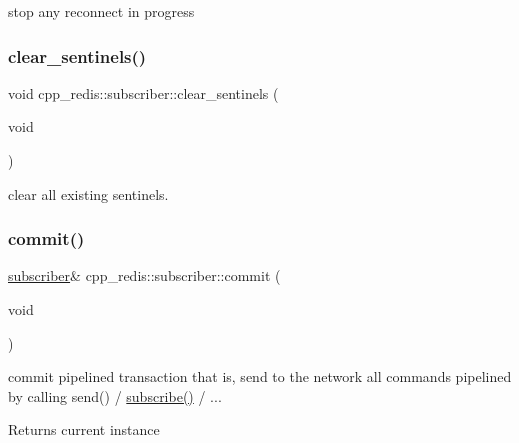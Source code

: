 stop any reconnect in progress \mbox{\label{classcpp__redis_1_1subscriber_ac8f371c14866842cdda7cf1ee5eee2b8}} 
\subsubsection{\texorpdfstring{clear\+\_\+sentinels()}{clear\_sentinels()}}
{\footnotesize\ttfamily void cpp\+\_\+redis\+::subscriber\+::clear\+\_\+sentinels (\begin{DoxyParamCaption}\item[{void}]{ }\end{DoxyParamCaption})}

clear all existing sentinels. \mbox{\label{classcpp__redis_1_1subscriber_abbf600802ed93b82323185eec5719ecb}} 
\subsubsection{\texorpdfstring{commit()}{commit()}}
{\footnotesize\ttfamily \hyperlink{classcpp__redis_1_1subscriber}{subscriber}\& cpp\+\_\+redis\+::subscriber\+::commit (\begin{DoxyParamCaption}\item[{void}]{ }\end{DoxyParamCaption})}

commit pipelined transaction that is, send to the network all commands pipelined by calling send() / \hyperlink{classcpp__redis_1_1subscriber_afee579c702182041645a3d3c55de4b9e}{subscribe()} / ...

\begin{DoxyReturn}{Returns}
current instance 
\end{DoxyReturn}
\mbox{\label{classcpp__redis_1_1subscriber_a6ae8134a9a9b31d6f2434ec4f6e86d3a}} 
